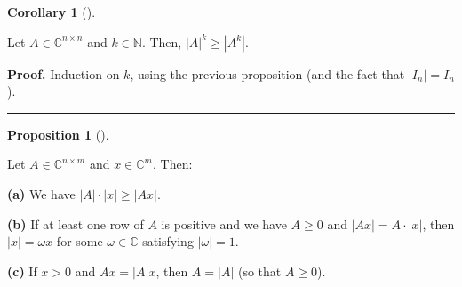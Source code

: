 \documentclass[numbers=enddot,12pt,final,onecolumn,notitlepage]{scrartcl}%
\numberwithin{exer}{subsection}
\theoremstyle{definition}
\newtheorem{prop}[theo]{Proposition}
\newenvironment{proposition}[1][]
{\begin{prop}[#1]\begin{leftbar}}
{\end{leftbar}\end{prop}}
\newtheorem{coro}[theo]{Corollary}
\newenvironment{corollary}[1][]
{\begin{coro}[#1]\begin{leftbar}}
{\end{leftbar}\end{coro}}
\newenvironment{proof}[1][Proof]{\noindent\textbf{#1.} }{\ \rule{0.5em}{0.5em}}
\begin{document}
\begin{corollary}
Let $A\in\mathbb{C}^{n\times n}$ and $k\in\mathbb{N}$. Then, $\left\vert
A\right\vert ^{k}\geq\left\vert A^{k}\right\vert $.
\end{corollary}

\begin{proof}
Induction on $k$, using the previous proposition (and the fact that
$\left\vert I_{n}\right\vert =I_{n}$).
\end{proof}

\begin{proposition}
Let $A\in\mathbb{C}^{n\times m}$ and $x\in\mathbb{C}^{m}$. Then:

\textbf{(a)} We have $\left\vert A\right\vert \cdot\left\vert x\right\vert
\geq\left\vert Ax\right\vert $.

\textbf{(b)} If at least one row of $A$ is positive and we have $A\geq0$ and
$\left\vert Ax\right\vert =A\cdot\left\vert x\right\vert $, then $\left\vert
x\right\vert =\omega x$ for some $\omega\in\mathbb{C}$ satisfying $\left\vert
\omega\right\vert =1$.

\textbf{(c)} If $x>0$ and $Ax=\left\vert A\right\vert x$, then $A=\left\vert
A\right\vert $ (so that $A\geq0$).
\end{proposition}
\end{document}
